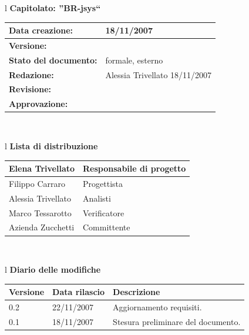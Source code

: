 \documentclass[11pt,titlepage,a4paper]{report}
\begin{document}
\begin{center}
\thispagestyle{plain}
\begin{table}[htbp]
\large{
\begin{tabular}{l}
\Large{\textbf{\textsf{Capitolato: ''BR-jsys``}}} \\
\begin{tabular}{||p{6cm}||p{6cm}||} \hline
\textbf{Data creazione:} & 18/11/2007 \\ \hline
\textbf{Versione:} & \lv \\ \hline
\textbf{Stato del documento:} & formale, esterno \\ \hline
\textbf{Redazione:} & Alessia Trivellato ­18/11/2007 \\ \hline
\textbf{Revisione:} &    \\ \hline
\textbf{Approvazione:}  & \\
\hline
\end{tabular} \\
\end{tabular}
}
\end{table}
\begin{table}[hbtp]
\large{
\begin{tabular}{l}
\Large{\textbf{\textsf{Lista di distribuzione}}} \\
\begin{tabular}{||p{6cm}||p{6cm}||}
\hline
{Elena Trivellato}& Responsabile di progetto \\ 
\hline 
{Filippo Carraro}& Progettista \\ 
\hline
{Alessia Trivellato}& Analisti \\
\hline
{Marco Tessarotto}& Verificatore \\
\hline
{Azienda Zucchetti}& Committente \\
\hline
\end{tabular} \\
\end{tabular}
}
\end{table}

\begin{table}[hbtp]
\large{
\begin{tabular}{l}
\Large{\textbf{\textsf{Diario delle modifiche}}} \\
\begin{tabular}{||p{2cm}||p{3.5cm}||p{6cm}||}
\hline
\textbf{Versione} & \textbf{Data rilascio} & \textbf{Descrizione} \\
\hline
0.2 & 22/11/2007 & Aggiornamento requisiti. \\
\hline
\hline
0.1 & 18/11/2007 & Stesura preliminare del documento. \\
\hline

\end{tabular} \\
\end{tabular}

}
\end{table}
\end{center}
\newpage
\tableofcontents
\end{document}
